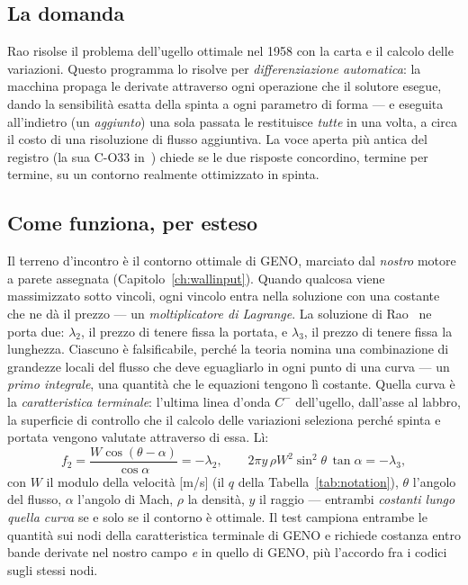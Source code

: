\subsection{La domanda}

Rao risolse il problema dell'ugello ottimale nel 1958 con la carta e
il calcolo delle variazioni. Questo programma lo risolve per
\emph{differenziazione automatica}: la macchina propaga le derivate
attraverso ogni operazione che il solutore esegue, dando la
sensibilità esatta della spinta a ogni parametro di forma --- e
eseguita all'indietro (un \emph{aggiunto}) una sola passata le
restituisce \emph{tutte} in una volta, a circa il costo di una
risoluzione di flusso aggiuntiva. La voce aperta più antica del
registro (la sua C-O33 in~\cite{theory}) chiede se le due risposte
concordino, termine per termine, su un contorno realmente ottimizzato
in spinta.

\subsection{Come funziona, per esteso}

Il terreno d'incontro è il contorno ottimale di GENO, marciato dal
\emph{nostro} motore a parete assegnata
(Capitolo~\ref{ch:wallinput}). Quando qualcosa viene massimizzato
sotto vincoli, ogni vincolo entra nella soluzione con una costante
che ne dà il prezzo --- un \emph{moltiplicatore di Lagrange}. La
soluzione di Rao~\cite{rao} ne porta due: $\lambda_2$, il prezzo di
tenere fissa la portata, e $\lambda_3$, il prezzo di tenere fissa la
lunghezza. Ciascuno è falsificabile, perché la teoria nomina una
combinazione di grandezze locali del flusso che deve eguagliarlo in
ogni punto di una curva --- un \emph{primo integrale}, una quantità
che le equazioni tengono lì costante. Quella curva è la
\emph{caratteristica terminale}: l'ultima linea d'onda $C^{-}$
dell'ugello, dall'asse al labbro, la superficie di controllo che il
calcolo delle variazioni seleziona perché spinta e portata vengono
valutate attraverso di essa. Lì:
\begin{equation}
f_2 = \frac{W\cos(\theta-\alpha)}{\cos\alpha} = -\lambda_2 ,
\qquad
2\pi y\,\rho W^{2}\sin^{2}\theta\,\tan\alpha = -\lambda_3 ,
\label{eq:firstintegrals}
\end{equation}
con $W$ il modulo della velocità [m/s] (il $q$ della
Tabella~\ref{tab:notation}), $\theta$ l'angolo del flusso, $\alpha$
l'angolo di Mach, $\rho$ la densità, $y$ il raggio --- entrambi
\emph{costanti lungo quella curva} se e solo se il contorno è
ottimale. Il test campiona entrambe le quantità sui nodi della
caratteristica terminale di GENO e richiede costanza entro bande
derivate nel nostro campo \emph{e} in quello di GENO, più l'accordo
fra i codici sugli stessi nodi.

